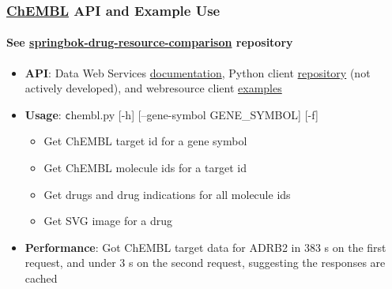 \documentclass[aspectratio=169,xcolor=dvipsnames]{beamer}
\begin{document}
\begin{frame}
  \frametitle{\href{https://www.ebi.ac.uk/chembl/}{ChEMBL} API and
    Example Use}
  \framesubtitle{See
    \href{https://github.com/ralatsdc/springbok-drug-resource-comparison}{springbok-drug-resource-comparison}
    repository}
  \begin{itemize}
  \item[] \textbf{API}: Data Web Services
    \href{https://chembl.gitbook.io/chembl-interface-documentation/web-services/chembl-data-web-services}{documentation},
    Python client
    \href{https://github.com/chembl/chembl_webresource_client}{repository}
    (not actively developed), and webresource client
    \href{http://beta.mybinder.org/v2/gh/chembl/chembl_webresource_client/master?filepath=demo_wrc.ipynb}{examples}
  \item[] \textbf{Usage}: {\texttt chembl.py [-h] [--gene-symbol GENE\_SYMBOL]
    [-f]}
    \begin{itemize}
    \item Get ChEMBL target id for a gene symbol
    \item Get ChEMBL molecule ids for a target id
    \item Get drugs and drug indications for all molecule ids
    \item Get SVG image for a drug
    \end{itemize}
  \item[] \textbf{Performance}: Got ChEMBL target data for ADRB2 in 383 s on
    the first request, and under 3 s on the second request, suggesting
    the responses are cached
  \end{itemize}
\end{frame}
\end{document}
